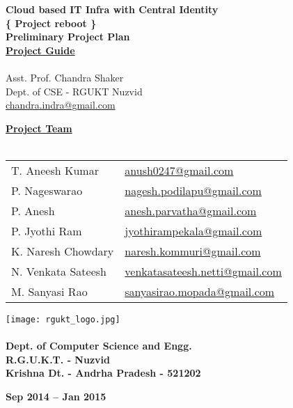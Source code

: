 \documentclass[12pt]{report}
\begin{document}
\begin{titlepage}
 \begin{center}
\LARGE
\textbf{Cloud based IT Infra with Central Identity} \\
\vfill
\large
\textbf{\{ Project reboot \}}\\
\vfill
\textbf{Preliminary Project Plan }\\
\vfill
\Large
\underline{\textbf{Project Guide }} \\ 
\large
\underline{} \\
Asst. Prof. Chandra Shaker \\
\normalsize
Dept. of CSE - RGUKT Nuzvid \\
\url{chandra.indra@gmail.com}
\vfill

\Large
\textbf{\underline{ Project Team } } \\
\underline{} \\
\large
\begin{tabular}{l  l}
T. Aneesh Kumar & \normalsize \url{anush0247@gmail.com} \\
P. Nageswarao  & \normalsize \url{nagesh.podilapu@gmail.com} \\
P. Anesh  & \normalsize \url{anesh.parvatha@gmail.com} \\
P. Jyothi Ram & \normalsize \url{jyothirampekala@gmail.com} \\
K. Naresh Chowdary  & \normalsize \url{naresh.kommuri@gmail.com} \\
N. Venkata Sateesh  & \normalsize \url{venkatasateesh.netti@gmail.com} \\
M. Sanyasi Rao & \normalsize \url{sanyasirao.mopada@gmail.com} 
\end{tabular}

\vfill


\texttt{[image: rgukt\_logo.jpg]} 
\Large
\underline{} \\
\underline{} \\
\normalsize
\textbf{Dept. of Computer Science and Engg. } \\
\textbf{R.G.U.K.T. - Nuzvid } \\
\textbf{Krishna Dt. - Andrha Pradesh - 521202}


\normalsize
\vfill
%
%

\textbf{Sep 2014 -- Jan 2015 }

\end{center}
\end{titlepage}
\end{document}
